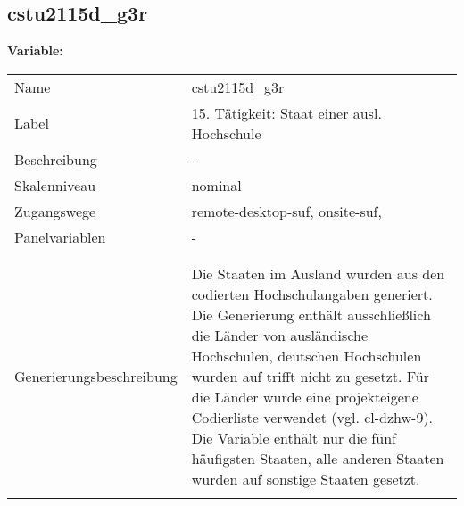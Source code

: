 	
	
	\subsection{cstu2115d\_g3r}
	\label{subSection:cstu2115d_g3r}

	\noindent\textbf{Variable:}\\
		\begin{tabular}{lL{11.3cm}}
			\label{tableVariable:cstu2115d_g3r}
			Name & cstu2115d\_g3r \\
			Label & 15. Tätigkeit: Staat einer ausl. Hochschule \\
			Beschreibung & - \\
			Skalenniveau & nominal \\
			Zugangswege &
				remote-desktop-suf,
				onsite-suf,
 \\
			Panelvariablen & -
			 \\
			 \\
 \\
					Generierungsbeschreibung & Die Staaten im Ausland wurden aus den codierten Hochschulangaben generiert. Die Generierung enthält ausschließlich die Länder von ausländische Hochschulen, deutschen Hochschulen wurden auf trifft nicht zu gesetzt. Für die Länder wurde eine projekteigene Codierliste verwendet (vgl. cl-dzhw-9). Die Variable enthält nur die fünf häufigsten Staaten, alle anderen Staaten wurden auf sonstige Staaten gesetzt. 
				 \\	
			 \\
		\end{tabular}






